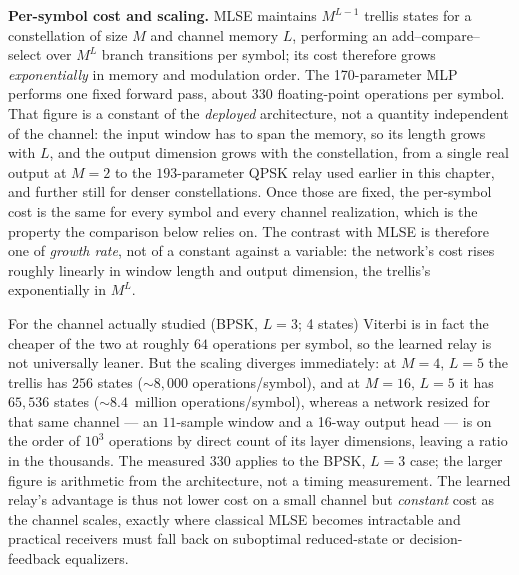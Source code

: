 \textbf{Per-symbol cost and scaling.} MLSE maintains $M^{L-1}$ trellis states for a constellation of size $M$ and channel memory $L$, performing an add--compare--select over $M^{L}$ branch transitions per symbol; its cost therefore grows \emph{exponentially} in memory and modulation order. The 170-parameter MLP performs one fixed forward pass, about $330$ floating-point operations per symbol. That figure is a constant of the \emph{deployed} architecture, not a quantity independent of the channel: the input window has to span the memory, so its length grows with $L$, and the output dimension grows with the constellation, from a single real output at $M=2$ to the $193$-parameter QPSK relay used earlier in this chapter, and further still for denser constellations. Once those are fixed, the per-symbol cost is the same for every symbol and every channel realization, which is the property the comparison below relies on. The contrast with MLSE is therefore one of \emph{growth rate}, not of a constant against a variable: the network's cost rises roughly linearly in window length and output dimension, the trellis's exponentially in $M^{L}$.

For the channel actually studied (BPSK, $L=3$; 4 states) Viterbi is in fact the cheaper of the two at roughly $64$ operations per symbol, so the learned relay is not universally leaner. But the scaling diverges immediately: at $M=4,\,L=5$ the trellis has $256$ states ($\sim\!8{,}000$ operations/symbol), and at $M=16,\,L=5$ it has $65{,}536$ states ($\sim\!8.4$~million operations/symbol), whereas a network resized for that same channel --- an $11$-sample window and a 16-way output head --- is on the order of $10^{3}$ operations by direct count of its layer dimensions, leaving a ratio in the thousands. The measured $330$ applies to the BPSK, $L=3$ case; the larger figure is arithmetic from the architecture, not a timing measurement. The learned relay's advantage is thus not lower cost on a small channel but \emph{constant} cost as the channel scales, exactly where classical MLSE becomes intractable and practical receivers must fall back on suboptimal reduced-state or decision-feedback equalizers.

